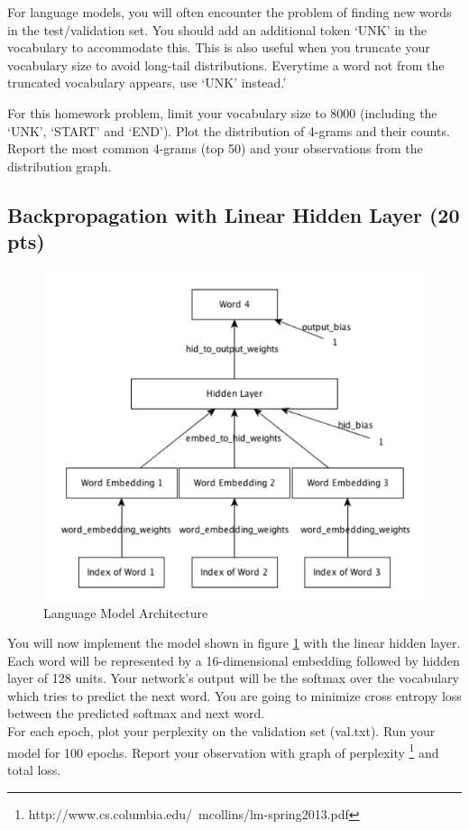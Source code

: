 \documentclass[10pt]{article}
\begin{document}
For language models, you will often encounter the problem of finding new words in the test/validation set. You should add an additional token `UNK' in the vocabulary to accommodate this. This is also useful when you truncate your vocabulary size to avoid long-tail distributions. Everytime a word not from the truncated vocabulary appears, use `UNK' instead.'

For this homework problem, limit your vocabulary size to 8000 (including the `UNK', `START' and `END'). Plot the distribution of 4-grams and their counts. Report the most common 4-grams (top 50) and your observations from the distribution graph.

\subsection{Backpropagation with Linear Hidden Layer (20 pts)}
\begin{figure}
  \centering
  \includegraphics[width=0.6\linewidth]{lm.png}
  \caption{Language Model Architecture}
  \label{fig:lm}
\end{figure}

You will now implement the model shown in figure \ref{fig:lm} with the linear 
hidden layer. 
Each word will be represented by a 16-dimensional embedding followed by hidden layer of 128 units. Your network's output will be the softmax over the vocabulary which tries to predict the next word. You are going to minimize cross entropy loss between the predicted softmax and next word.
\\

For each epoch, plot your perplexity on the validation set (val.txt). Run your model for 100 epochs. Report your observation with graph of perplexity \footnote{http://www.cs.columbia.edu/~mcollins/lm-spring2013.pdf} and total loss.
\\
\end{document}
